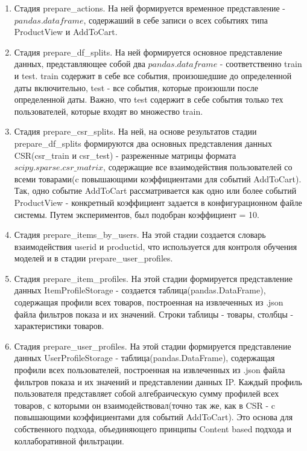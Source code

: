 \documentclass[14pt]{mmcs_article}
\newenvironment{myenumerate}
{ \begin{enumerate}
		\setlength{\itemsep}{0pt}
		\setlength{\parskip}{0pt}
		\setlength{\parsep}{0pt}     }
	{ \end{enumerate}                  }
\begin{document}
\begin{myenumerate}
	\item Стадия prepare\_actions. На ней формируется временное представление - $pandas$.$dataframe$, содержаший в себе записи о всех событиях типа  ProductView и AddToCart.
	\item Стадия prepare\_df\_splits. На ней формируется основное представление данных, представляющее собой два  $pandas$.$dataframe$ - соответственно train и test. train содержит в себе все события, произошедшие до определенной даты включительно, test - все события, которые произошли после определенной даты. Важно, что test содержит в себе события только тех пользователей, которые входят во множество train. 
	\item Стадия prepare\_csr\_splits. На ней, на основе результатов стадии \\ prepare\_df\_splits формируются два основных представления данных CSR(csr\_train и csr\_test) - разреженные матрицы формата \\$scipy$.$sparse$.$csr\_matrix$, содержащие все взаимодействия пользователей со всеми товарами(c повышающими коэффициентами для событий AddToCart). Так, одно событие AddToCart рассматривается как одно или более событий ProductView - конкретный коэффициент задается в конфигурационном файле системы. Путем экспериментов, был подобран коэффициент = 10.
	\item Стадия prepare\_items\_by\_users. На этой стадии создается словарь взаимодействия userid и productid, что используется для контроля обучения моделей и в стадии prepare\_user\_profiles.
	\item Стадия prepare\_item\_profiles. На этой стадии формируется представление данных ItemProfileStorage - создается таблица(pandas.DataFrame), содержащая профили всех товаров, построенная на извлеченных из .json файла фильтров показа и их значений. Строки таблицы - товары, столбцы - характеристики товаров. 
	\item Стадия prepare\_user\_profiles. На этой стадии формируется представление данных UserProfileStorage - таблица(pandas.DataFrame), содержащая профили всех пользователей, построенная на извлеченных из .json файла фильтров показа и их значений и представлении данных IP. Каждый профиль пользователя представляет собой алгебраическую сумму профилей всех товаров, с которыми он взаимодействовал(точно так же, как в CSR - c повышающими коэффициентами для событий AddToCart). Это основа для собственного подхода, объединяющего принципы Content based подхода и коллаборативной фильтрации.
	
\end{myenumerate}
\end{document}
